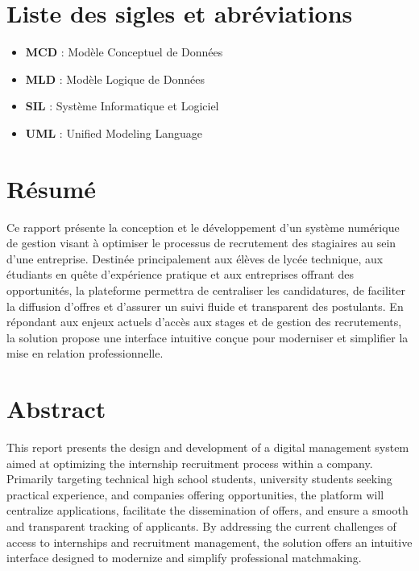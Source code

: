 \documentclass[12pt,a4paper,oneside]{memoir}
\let\cleardoublepage\clearpage
\begin{document}
	\cleardoublepage
	\chapter*{Liste des sigles et abréviations}
	\begin{itemize}
		\item \textbf{MCD} : Modèle Conceptuel de Données
		\item \textbf{MLD} : Modèle Logique de Données
		\item \textbf{SIL} : Système Informatique et Logiciel
		\item \textbf{UML} : Unified Modeling Language
	\end{itemize}
	
	\cleardoublepage
	\listoffigures
	
	\cleardoublepage
	\chapter*{Résumé}
	Ce rapport présente la conception et le développement d'un système numérique de gestion visant à optimiser le processus de recrutement des stagiaires au sein d'une entreprise. Destinée principalement aux élèves de lycée technique, aux étudiants en quête d'expérience pratique et aux entreprises offrant des opportunités, la plateforme permettra de centraliser les candidatures, de faciliter la diffusion d'offres et d'assurer un suivi fluide et transparent des postulants. En répondant aux enjeux actuels d'accès aux stages et de gestion des recrutements, la solution propose une interface intuitive conçue pour moderniser et simplifier la mise en relation professionnelle.
	
	\cleardoublepage
	\chapter*{Abstract}
	This report presents the design and development of a digital management system aimed at optimizing the internship recruitment process within a company. Primarily targeting technical high school students, university students seeking practical experience, and companies offering opportunities, the platform will centralize applications, facilitate the dissemination of offers, and ensure a smooth and transparent tracking of applicants. By addressing the current challenges of access to internships and recruitment management, the solution offers an intuitive interface designed to modernize and simplify professional matchmaking.
	
\end{document}
